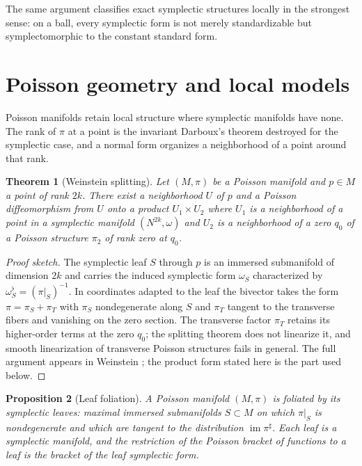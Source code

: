 \documentclass[11pt,letterpaper]{article}
\newtheorem{theorem}{Theorem}[section]
\newtheorem{proposition}[theorem]{Proposition}
\theoremstyle{definition}
\theoremstyle{remark}
\begin{document}
The same argument classifies exact symplectic structures locally in the strongest sense: on a ball, every symplectic form is not merely standardizable but symplectomorphic to the constant standard form. 

\section{Poisson geometry and local models}

Poisson manifolds retain local structure where symplectic manifolds have none. The rank of $\pi$ at a point is the invariant Darboux's theorem destroyed for the symplectic case, and a normal form organizes a neighborhood of a point around that rank.

\begin{theorem}[Weinstein splitting]
\label{thm:weinstein}
Let $(M, \pi)$ be a Poisson manifold and $p \in M$ a point of rank $2k$. There exist a neighborhood $U$ of $p$ and a Poisson diffeomorphism from $U$ onto a product $U_1 \times U_2$ where $U_1$ is a neighborhood of a point in a symplectic manifold $(N^{2k}, \omega)$ and $U_2$ is a neighborhood of a zero $q_0$ of a Poisson structure $\pi_2$ of rank zero at $q_0$.
\end{theorem}

\begin{proof}[Proof sketch]
The symplectic leaf $S$ through $p$ is an immersed submanifold of dimension $2k$ and carries the induced symplectic form $\omega_S$ characterized by $\omega_S^{\flat} = (\pi|_S)^{-1}$. In coordinates adapted to the leaf the bivector takes the form $\pi = \pi_S + \pi_T$ with $\pi_S$ nondegenerate along $S$ and $\pi_T$ tangent to the transverse fibers and vanishing on the zero section. The transverse factor $\pi_T$ retains its higher-order terms at the zero $q_0$; the splitting theorem does not linearize it, and smooth linearization of transverse Poisson structures fails in general. The full argument appears in Weinstein \cite{weinstein}; the product form stated here is the part used below.
\end{proof}

\begin{proposition}[Leaf foliation]
\label{prop:leaves}
A Poisson manifold $(M, \pi)$ is foliated by its symplectic leaves: maximal immersed submanifolds $S \subset M$ on which $\pi|_S$ is nondegenerate and which are tangent to the distribution $\operatorname{im} \pi^{\sharp}$. Each leaf is a symplectic manifold, and the restriction of the Poisson bracket of functions to a leaf is the bracket of the leaf symplectic form.
\end{proposition}
\end{document}
